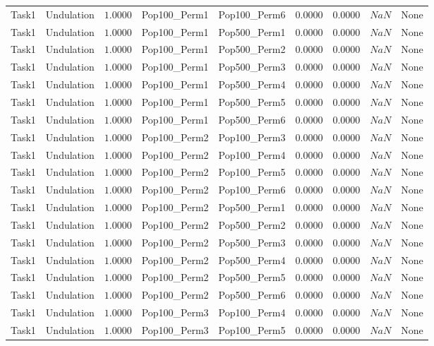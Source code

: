 \documentclass[8pt]{article}
\begin{document}
\begin{longtable}{llccccccc}
Task1 & Undulation & $1.0000$ & Pop100\_Perm1 & Pop100\_Perm6 & 0.0000 & 0.0000 & $NaN$ & None \\
Task1 & Undulation & $1.0000$ & Pop100\_Perm1 & Pop500\_Perm1 & 0.0000 & 0.0000 & $NaN$ & None \\
Task1 & Undulation & $1.0000$ & Pop100\_Perm1 & Pop500\_Perm2 & 0.0000 & 0.0000 & $NaN$ & None \\
Task1 & Undulation & $1.0000$ & Pop100\_Perm1 & Pop500\_Perm3 & 0.0000 & 0.0000 & $NaN$ & None \\
Task1 & Undulation & $1.0000$ & Pop100\_Perm1 & Pop500\_Perm4 & 0.0000 & 0.0000 & $NaN$ & None \\
Task1 & Undulation & $1.0000$ & Pop100\_Perm1 & Pop500\_Perm5 & 0.0000 & 0.0000 & $NaN$ & None \\
Task1 & Undulation & $1.0000$ & Pop100\_Perm1 & Pop500\_Perm6 & 0.0000 & 0.0000 & $NaN$ & None \\
Task1 & Undulation & $1.0000$ & Pop100\_Perm2 & Pop100\_Perm3 & 0.0000 & 0.0000 & $NaN$ & None \\
Task1 & Undulation & $1.0000$ & Pop100\_Perm2 & Pop100\_Perm4 & 0.0000 & 0.0000 & $NaN$ & None \\
Task1 & Undulation & $1.0000$ & Pop100\_Perm2 & Pop100\_Perm5 & 0.0000 & 0.0000 & $NaN$ & None \\
Task1 & Undulation & $1.0000$ & Pop100\_Perm2 & Pop100\_Perm6 & 0.0000 & 0.0000 & $NaN$ & None \\
Task1 & Undulation & $1.0000$ & Pop100\_Perm2 & Pop500\_Perm1 & 0.0000 & 0.0000 & $NaN$ & None \\
Task1 & Undulation & $1.0000$ & Pop100\_Perm2 & Pop500\_Perm2 & 0.0000 & 0.0000 & $NaN$ & None \\
Task1 & Undulation & $1.0000$ & Pop100\_Perm2 & Pop500\_Perm3 & 0.0000 & 0.0000 & $NaN$ & None \\
Task1 & Undulation & $1.0000$ & Pop100\_Perm2 & Pop500\_Perm4 & 0.0000 & 0.0000 & $NaN$ & None \\
Task1 & Undulation & $1.0000$ & Pop100\_Perm2 & Pop500\_Perm5 & 0.0000 & 0.0000 & $NaN$ & None \\
Task1 & Undulation & $1.0000$ & Pop100\_Perm2 & Pop500\_Perm6 & 0.0000 & 0.0000 & $NaN$ & None \\
Task1 & Undulation & $1.0000$ & Pop100\_Perm3 & Pop100\_Perm4 & 0.0000 & 0.0000 & $NaN$ & None \\
Task1 & Undulation & $1.0000$ & Pop100\_Perm3 & Pop100\_Perm5 & 0.0000 & 0.0000 & $NaN$ & None \\

\end{longtable}
\end{document}
